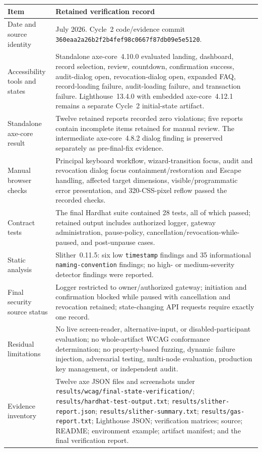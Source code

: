\documentclass[10pt]{article}
\begin{document}
\begin{center}\small
\begin{tabularx}{\textwidth}{|p{3.5cm}|>{\raggedright\arraybackslash}X|}
\hline
\textbf{Item} & \textbf{Retained verification record}\\\hline
Date and source identity & 15 July 2026. Cycle~2 code/evidence commit \texttt{360eaa2a26b2f2b4fef98c0667f87db09e5e5120}.\\\hline
Accessibility tools and states & Standalone axe-core~4.10.0 evaluated landing, dashboard, record selection, review, countdown, confirmation success, audit-dialog open, revocation-dialog open, expanded FAQ, record-loading failure, audit-loading failure, and transaction failure. Lighthouse~13.4.0 with embedded axe-core~4.12.1 remains a separate Cycle~2 initial-state artifact.\\\hline
Standalone axe-core result & Twelve retained reports recorded zero violations; five reports contain incomplete items retained for manual review. The intermediate axe-core~4.8.2 dialog finding is preserved separately as pre-final-fix evidence.\\\hline
Manual browser checks & Principal keyboard workflow, wizard-transition focus, audit and revocation dialog focus containment/restoration and Escape handling, affected target dimensions, visible/programmatic error presentation, and 320-CSS-pixel reflow passed the recorded checks.\\\hline
Contract tests & The final Hardhat suite contained 28 tests, all of which passed; retained output includes authorized logger, gateway administration, pause-policy, cancellation/revocation-while-paused, and post-unpause cases.\\\hline
Static analysis & Slither~0.11.5: six low \texttt{timestamp} findings and 35 informational \texttt{naming-convention} findings; no high- or medium-severity detector findings were reported.\\\hline
Final security source status & Logger restricted to owner/authorized gateway; initiation and confirmation blocked while paused with cancellation and revocation retained; state-changing API requests require exactly one record.\\\hline
Residual limitations & No live screen-reader, alternative-input, or disabled-participant evaluation; no whole-artifact WCAG conformance determination; no property-based fuzzing, dynamic failure injection, adversarial testing, multi-node evaluation, production key management, or independent audit.\\\hline
Evidence inventory & Twelve axe JSON files and screenshots under \texttt{results/wcag/final-state-verification/}; \texttt{results/hardhat-test-output.txt}; \texttt{results/slither-report.json}; \texttt{results/slither-summary.txt}; \texttt{results/gas-report.txt}; Lighthouse JSON; verification matrices; source; README; environment example; artifact manifest; and the final verification report.\\\hline
\end{tabularx}
\end{center}
\end{document}
